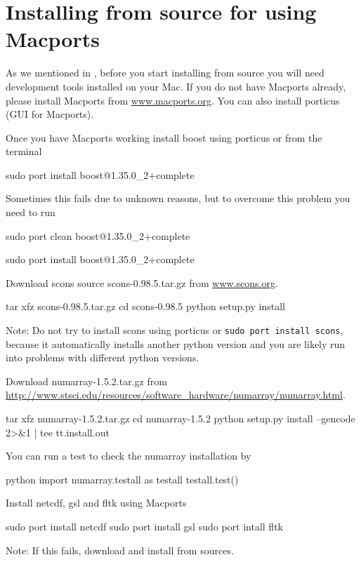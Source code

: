 \section{Installing from source for \macosx using Macports}
\label{sec:srcmacports}

As we mentioned in , before you start installing from source you will need \macosx development tools installed on your Mac. 
If you do not have Macports already, please install Macports from \url{www.macports.org}. You can also install porticus (GUI for Macports).
 
Once you have Macports working install boost using porticus or from the terminal 
\begin{shellCode}
sudo port install boost@1.35.0_2+complete
\end{shellCode}
Sometimes this fails due to unknown reasons, but to overcome this problem you need to run
\begin{shellCode}
sudo port clean boost@1.35.0_2+complete

sudo port install boost@1.35.0_2+complete
 \end{shellCode}
  
Download scons source scons-0.98.5.tar.gz from \url{www.scons.org}.
\begin{shellCode}
tar xfz scons-0.98.5.tar.gz
cd scons-0.98.5
python setup.py install
\end{shellCode}

Note: Do not try to install scons using porticus or \texttt{sudo port install scons}, because it automatically installs another python version and you are likely run into problems with different python versions.  
 
Download numarray-1.5.2.tar.gz from \\
\url{http://www.stsci.edu/resources/software_hardware/numarray/numarray.html}. 
\begin{shellCode}
tar xfz numarray-1.5.2.tar.gz
cd numarray-1.5.2
python setup.py install --gencode  2>&1 | tee tt.install.out
\end{shellCode}

You can run a test to check the numarray installation by
\begin{shellCode}
python
import numarray.testall as testall
testall.test()
\end{shellCode}
 
Install netcdf, gsl and fltk using Macports 
\begin{shellCode}
sudo port install netcdf
sudo port install gsl
sudo port intall fltk
\end{shellCode}
Note: If this fails, download and install from sources. 
 
